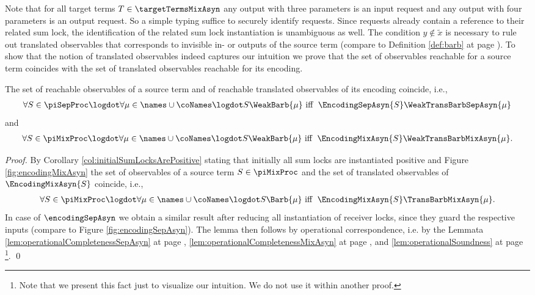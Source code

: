 \documentclass[]{llncs}
\begin{document}
Note that for all target terms $ T \in \targetTermsMixAsyn $ any output with three parameters is an input request and any output with four parameters is an output request. So a simple typing suffice to securely identify requests. Since requests already contain a reference to their related sum lock, the identification of the related sum lock instantiation is unambiguous as well. The condition $ y \notin \tilde{x} $ is necessary to rule out translated observables that corresponds to invisible in- or outputs of the source term (compare to Definition \ref{def:barb} at page \pageref{def:barb}). To show that the notion of translated observables indeed captures our intuition we prove that the set of observables reachable for a source term coincides with the set of translated observables reachable for its encoding.

\begin{lemma}
	The set of reachable observables of a source term and of reachable translated observables of its encoding coincide, i.e.,
	\begin{align*}
		\forall S \in \piSepProc \logdot \forall \mu \in \names \cup \coNames \logdot S\WeakBarb{\mu} \text{ iff } \; \EncodingSepAsyn{S}\WeakTransBarbSepAsyn{\mu}
	\end{align*}
	and
	\begin{align*}
		\forall S \in \piMixProc \logdot \forall \mu \in \names \cup \coNames \logdot S\WeakBarb{\mu} \text{ iff } \; \EncodingMixAsyn{S}\WeakTransBarbMixAsyn{\mu}.
	\end{align*}
\end{lemma}

\begin{proof}
	By Corollary \ref{col:initialSumLocksArePositive} stating that initially all sum locks are instantiated positive and Figure \ref{fig:encodingMixAsyn} the set of observables of a source term $ S \in \piMixProc $ and the set of translated observables of $ \EncodingMixAsyn{S} $ coincide, i.e.,
	\begin{align*}
		\forall S \in \piMixProc \logdot \forall \mu \in \names \cup \coNames \logdot S\Barb{\mu} \text{ iff } \; \EncodingMixAsyn{S}\TransBarbMixAsyn{\mu}.
	\end{align*}
	In case of $ \encodingSepAsyn $ we obtain a similar result after reducing all instantiation of receiver locks, since they guard the respective inputs (compare to Figure \ref{fig:encodingSepAsyn}). The lemma then follows by operational correspondence, i.e. by the Lemmata \ref{lem:operationalCompletenessSepAsyn} at page \pageref{lem:operationalCompletenessSepAsyn}, \ref{lem:operationalCompletenessMixAsyn} at page \pageref{lem:operationalCompletenessMixAsyn},  and \ref{lem:operationalSoundness} at page \pageref{lem:operationalSoundness}\footnote{Note that we present this fact just to visualize our intuition. We do not use it within another proof.}.
	\qed
\end{proof}
\end{document}
